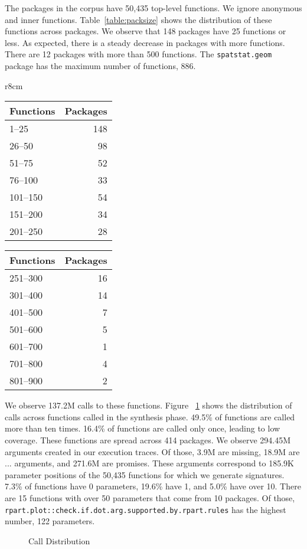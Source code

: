 \documentclass[review,nonacm,screen,acmsmall,anonymous=true]{acmart}
\renewcommand{\c}[1]{\lstinline |#1|\xspace}
\begin{document}
The packages in the corpus have 50,435 top-level functions. We ignore anonymous
and inner functions. Table~\ref{table:packsize} shows the distribution of these
functions across packages. We observe that 148 packages have 25 functions or
less. As expected, there is a steady decrease in packages with more functions.
There are 12 packages with more than 500 functions. The \c{spatstat.geom} package
has the maximum number of functions, 886.

\begin{wraptable}{r}{8cm}
  \vspace{-3mm}
  \small
  \caption{Package Size} \label{table:packsize}
  \centering
  \begin{tabular}{lr}
    \toprule
    \bf Functions&\bf Packages\\
    \midrule
    1--25&148\\
    26--50&98\\
    51--75&52\\
    76--100&33\\
    101--150&54\\
    151--200&34\\
    201--250&28\\
    \bottomrule
  \end{tabular}
  \quad
  \begin{tabular}{lr}
    \toprule
    \bf Functions&\bf Packages\\
    \midrule
    251--300&16\\
    301--400&14\\
    401--500&7\\
    501--600&5\\
    601--700&1\\
    701--800&4\\
    801--900&2\\
    \bottomrule
  \end{tabular}
\end{wraptable}


We observe 137.2M calls to these functions. Figure ~\ref{fig:callDist} shows the
distribution of calls across functions called in the synthesis
phase. 49.5\% of functions are called more than ten times. 16.4\% of functions are
called only once, leading to low coverage. These functions are spread across 414
packages.
We observe 294.45M arguments created in our execution traces. Of those, 3.9M are
missing, 18.9M are $...$ arguments, and 271.6M are promises. These arguments
correspond to 185.9K parameter positions of the 50,435 functions for which we
generate signatures.
7.3\% of functions have 0 parameters, 19.6\% have 1, and 5.0\% have over 10. There
are 15 functions with over 50 parameters that come from 10 packages. Of those,
\c{rpart.plot::check.if.dot.arg.supported.by.rpart.rules} has the highest number,
122 parameters.
%
\begin{figure}[!h]
  \centering
  
  \caption{Call Distribution}
  \label{fig:callDist}
\end{figure}
%
\end{document}
